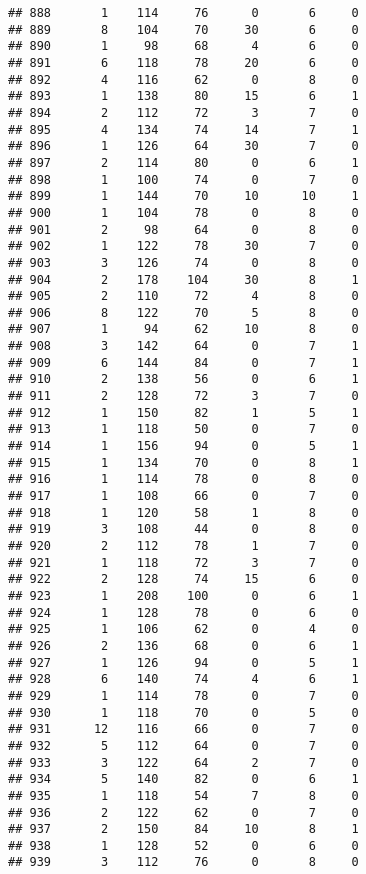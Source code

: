 \documentclass[
]{article}
\begin{document}
\begin{verbatim}
## 888       1    114     76      0       6     0
## 889       8    104     70     30       6     0
## 890       1     98     68      4       6     0
## 891       6    118     78     20       6     0
## 892       4    116     62      0       8     0
## 893       1    138     80     15       6     1
## 894       2    112     72      3       7     0
## 895       4    134     74     14       7     1
## 896       1    126     64     30       7     0
## 897       2    114     80      0       6     1
## 898       1    100     74      0       7     0
## 899       1    144     70     10      10     1
## 900       1    104     78      0       8     0
## 901       2     98     64      0       8     0
## 902       1    122     78     30       7     0
## 903       3    126     74      0       8     0
## 904       2    178    104     30       8     1
## 905       2    110     72      4       8     0
## 906       8    122     70      5       8     0
## 907       1     94     62     10       8     0
## 908       3    142     64      0       7     1
## 909       6    144     84      0       7     1
## 910       2    138     56      0       6     1
## 911       2    128     72      3       7     0
## 912       1    150     82      1       5     1
## 913       1    118     50      0       7     0
## 914       1    156     94      0       5     1
## 915       1    134     70      0       8     1
## 916       1    114     78      0       8     0
## 917       1    108     66      0       7     0
## 918       1    120     58      1       8     0
## 919       3    108     44      0       8     0
## 920       2    112     78      1       7     0
## 921       1    118     72      3       7     0
## 922       2    128     74     15       6     0
## 923       1    208    100      0       6     1
## 924       1    128     78      0       6     0
## 925       1    106     62      0       4     0
## 926       2    136     68      0       6     1
## 927       1    126     94      0       5     1
## 928       6    140     74      4       6     1
## 929       1    114     78      0       7     0
## 930       1    118     70      0       5     0
## 931      12    116     66      0       7     0
## 932       5    112     64      0       7     0
## 933       3    122     64      2       7     0
## 934       5    140     82      0       6     1
## 935       1    118     54      7       8     0
## 936       2    122     62      0       7     0
## 937       2    150     84     10       8     1
## 938       1    128     52      0       6     0
## 939       3    112     76      0       8     0

\end{verbatim}
\end{document}
